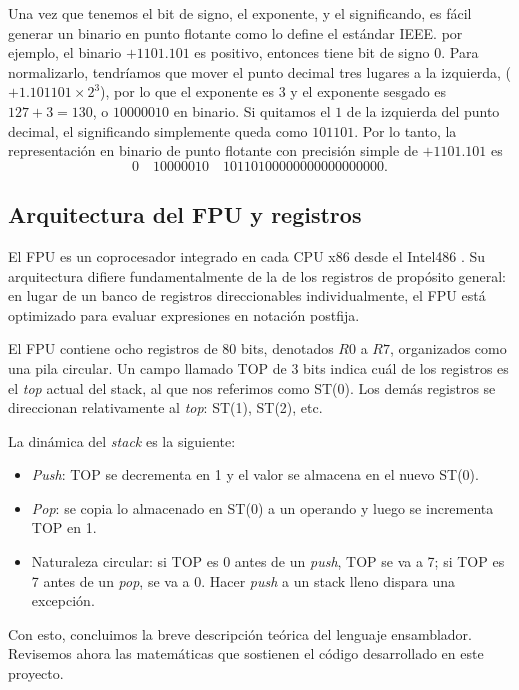 \documentclass[12pt]{article}
\begin{document}
Una vez que tenemos el bit de signo, el exponente, y el significando, es fácil
generar un binario en punto flotante como lo define el estándar IEEE. por
ejemplo, el binario $+1101.101$ es positivo, entonces tiene bit de signo 0.
Para normalizarlo, tendríamos que mover el punto decimal tres lugares a la
izquierda, ($+1.101101 \times 2^{3}$), por lo que el exponente es $3$ y el
exponente sesgado es $127+3=130$, o $10000010$ en binario. Si quitamos el $1$
de la izquierda del punto decimal, el significando simplemente queda como
$101101$. Por lo tanto, la representación en binario de punto flotante con
precisión simple de $+1101.101$ es
\begin{equation*}
  0 \quad 10000010 \quad 10110100000000000000000.
\end{equation*}

\subsection{Arquitectura del FPU y registros}

El FPU es un coprocesador integrado en cada CPU x86 desde el Intel486
\parencite{IrvineBook}. Su arquitectura difiere fundamentalmente de la de los
registros de propósito general: en lugar de un banco de registros
direccionables individualmente, el FPU está optimizado para evaluar expresiones
en notación postfija.

El FPU contiene ocho registros de 80 bits, denotados $R0$ a $R7$, organizados
como una pila circular. Un campo llamado TOP de 3 bits indica cuál de los
registros es el \textit{top} actual del stack, al que nos referimos como ST(0).
Los demás registros se direccionan relativamente al \textit{top}: ST(1), ST(2),
etc.

La dinámica del \textit{stack} es la siguiente:
\begin{itemize}
  \item \textit{Push}: TOP se decrementa en 1 y el valor se almacena en el
    nuevo ST(0).
  \item \textit{Pop}: se copia lo almacenado en ST(0) a un operando y luego se
    incrementa TOP en 1.
  \item Naturaleza circular: si TOP es 0 antes de un \textit{push}, TOP se va a
    7; si TOP es 7 antes de un \textit{pop}, se va a 0. Hacer \textit{push} a
    un stack lleno dispara una excepción.
\end{itemize}

Con esto, concluimos la breve descripción teórica del lenguaje ensamblador.
Revisemos ahora las matemáticas que sostienen el código desarrollado en este
proyecto.
\end{document}
